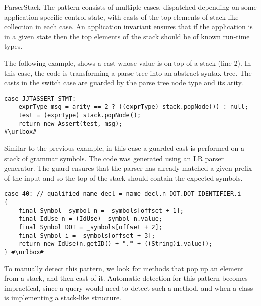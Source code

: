 \begin{pattern}{ParserStack}
The \thisp{} pattern consists of multiple cases,
dispatched depending on some application-specific control state,
with casts of the top elements of stack-like collection in each case.
An application invariant ensures that if the application is in a given 
state then the top elements of the stack should be of known run-time types.

\instances{}
The following example,
shows a cast whose value is on top of a stack (line 2).
In this case,
the code is transforming a parse tree into an abstract syntax tree.
The casts in the switch case are guarded by the parse tree node type and
its arity. 

\def\urlvar{http://bit.ly/fabioz_Pydev_2HF6nrF}
\begin{verbatim}
case JJTASSERT_STMT:
    exprType msg = arity == 2 ? ((exprType) stack.popNode()) : null;
    test = (exprType) stack.popNode();
    return new Assert(test, msg);
#\urlbox#
\end{verbatim}

Similar to the previous example,
in this case a guarded cast is performed on a stack of grammar symbols.
The code was generated using an LR parser generator.
The guard ensures that the parser has already matched a given prefix of the
input and so the top of the stack should contain the expected symbols.

\def\urlvar{http://bit.ly/Sable_soot_2MZLZ3m}
\begin{verbatim}
case 40: // qualified_name_decl = name_decl.n DOT.DOT IDENTIFIER.i
{
    final Symbol _symbol_n = _symbols[offset + 1];
    final IdUse n = (IdUse) _symbol_n.value;
    final Symbol DOT = _symbols[offset + 2];
    final Symbol i = _symbols[offset + 3];
    return new IdUse(n.getID() + "." + ((String)i.value));
} #\urlbox#
\end{verbatim}


\detection{}
To manually detect this pattern,
we look for methods that pop up an element from a stack,
and then cast of it.
Automatic detection for this pattern becomes impractical,
since a query would need to detect such a method,
and when a class is implementing a stack-like structure.



\end{pattern}
